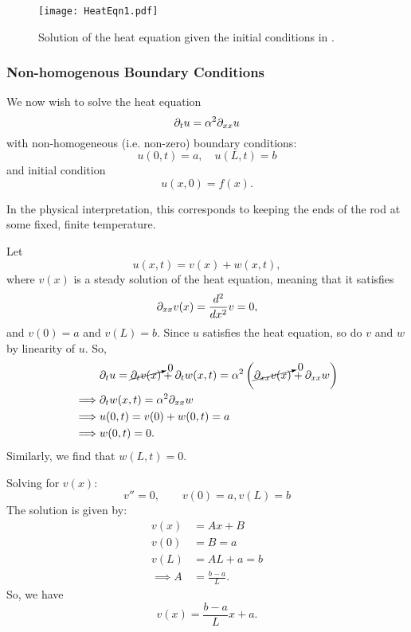 \begin{figure}[!ht]
	\centering
	\texttt{[image: HeatEqn1.pdf]}
	\caption{Solution of the heat equation given the initial conditions in .}
	\label{fig:heateqneg1}
\end{figure}

\subsubsection{Non-homogenous Boundary Conditions}

We now wish to solve the heat equation 
\[
\partial_t u = \alpha^2 \partial_{xx} u
\]
with non-homogeneous (i.e. non-zero) boundary conditions:
\[
u(0,t) = a, \quad u(L,t) = b
\]
and initial condition
\[
u(x,0) = f(x).
\]

In the physical interpretation, this corresponds to keeping the ends of the rod at some fixed, finite temperature.

Let
\begin{equation}
	u(x,t) = v(x) + w(x,t),
\end{equation}
where $v(x)$ is a steady solution of the heat equation, meaning that it satisfies
\[
\partial_{xx} v(x) = \frac{d^2}{dx^2} v = 0,
\]
and $v(0) = a$ and $v(L) = b$.
Since $u$ satisfies the heat equation, so do $v$ and $w$ by linearity of $u$. So,
\begin{align*}
	& \partial_t u = \cancelto{0}{\partial_t v(x)} + \partial_t w(x,t) = \alpha^2 \left( \cancelto{0}{\partial_{xx} v(x)} + \partial_{xx} w \right)\\
	\implies & \partial_t w(x,t) = \alpha^2 \partial_{xx} w \\
	\implies & u(0,t) = v(0) + w(0,t) = a \\
	\implies & w(0,t) = 0.
\end{align*}
Similarly, we find that $w(L,t) = 0$.

Solving for $v(x)$:
\[
v'' = 0, \qquad v(0) = a, v(L) = b
\]
The solution is given by:
\begin{align*}
	v(x) &= Ax + B \\
	v(0) & = B = a \\
	v(L) & = AL + a = b \\
	\implies A &= \frac{b-a}{L}.
\end{align*}
So, we have
\[
v(x) = \frac{b-a}{L}x + a.
\]

